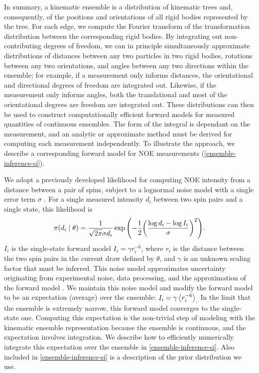 \documentclass[../../main.tex]{subfiles}
\begin{document}
\begin{refsection}
	In summary, a kinematic ensemble is a distribution of kinematic trees and, consequently, of the positions and orientations of all rigid bodies represented by the tree.
	For each edge, we compute the Fourier transform of the transformation distribution between the corresponding rigid bodies.
	By integrating out non-contributing degrees of freedom, we can in principle simultaneously approximate distributions of distances between any two particles in two rigid bodies, rotations between any two orientations, and angles between any two directions within the ensemble;
	for example, if a measurement only informs distances, the orientational and directional degrees of freedom are integrated out.
	Likewise, if the measurement only informs angles, both the translational and most of the orientational degrees are freedom are integrated out.
	These distributions can then be used to construct computationally efficient forward models for measured quantities of continuous ensembles.
	The form of the integral is dependant on the measurement, and an analytic or approximate method must be derived for computing each measurement independently.
	To illustrate the approach, we describe a corresponding forward model for NOE measurements (\cref{ensemble-inference-si}).



	We adopt a previously developed likelihood for computing NOE intensity from a distance between a pair of spins, subject to a lognormal noise model with a single error term $\sigma$ \supercite{riepingInferentialStructureDetermination2005}.
	For a single measured intensity $d_i$ between two spin pairs and a single state, this likelihood is
	$$\pi(d_i \mid \theta) = \frac{1}{\sqrt{2\pi} \sigma d_i} \exp\qty(-\frac{1}{2}\qty(\frac{\log d_i - \log I_i}{\sigma})^2).$$
	$I_i$ is the single-state forward model $I_i = \gamma r_i^{-6}$, where $r_i$ is the distance between the two spin pairs in the current draw defined by $\theta$, and $\gamma$ is an unknown scaling factor that must be inferred.
	This noise model approximates uncertainty originating from experimental noise, data processing, and the approximation of the forward model \supercite{riepingInferentialStructureDetermination2005}.
	We maintain this noise model and modify the forward model to be an expectation (average) over the ensemble\supercite{brungerThreedimensionalStructureProteins1986,cloreApplicationMolecularDynamics1986,fletcherTreatmentNOEConstraints1996}:
	$I_i = \gamma \left\langle  r_i^{-6}  \right\rangle_{.}$
	In the limit that the ensemble is extremely narrow, this forward model converges to the single-state one.
	Computing this expectation is the non-trivial step of modeling with the kinematic ensemble representation because the ensemble is continuous, and the expectation involves integration.
	We describe how to efficiently numerically integrate this expectation over the ensemble in \cref{ensemble-inference-si}.
	Also included in \cref{ensemble-inference-si} is a description of the prior distribution we use.


\end{refsection}
\end{document}
